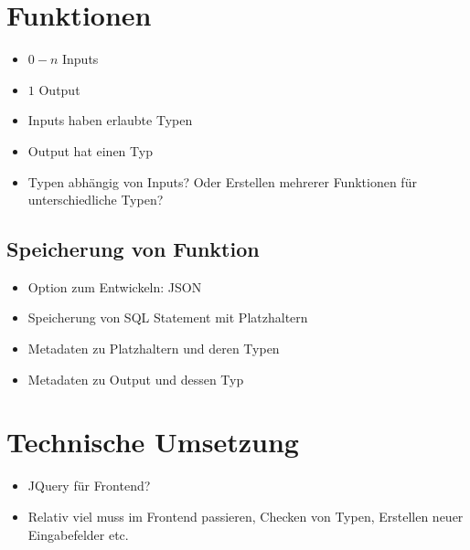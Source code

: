 \section*{Funktionen}
\begin{itemize}
  \item $0-n$ Inputs
  \item $1$ Output
  \item Inputs haben erlaubte Typen
  \item Output hat einen Typ
  \item Typen abhängig von Inputs? Oder Erstellen mehrerer Funktionen für unterschiedliche Typen?
\end{itemize}

\subsection*{Speicherung von Funktion}
\begin{itemize}
  \item Option zum Entwickeln: JSON
  \item Speicherung von SQL Statement mit Platzhaltern
  \item Metadaten zu Platzhaltern und deren Typen
  \item Metadaten zu Output und dessen Typ
\end{itemize}

\section*{Technische Umsetzung}
\begin{itemize}
  \item JQuery für Frontend?
  \item Relativ viel muss im Frontend passieren, Checken von Typen, Erstellen neuer Eingabefelder etc.
\end{itemize}
